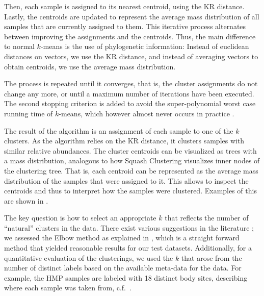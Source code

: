 Then, each sample is assigned to its nearest centroid, using the KR distance. %
Lastly, the centroids are updated to represent
the average mass distribution of all samples that are currently assigned to them.
This iterative process alternates between improving the assignments and the centroids.
Thus, the main difference to normal $k$-means is the use of phylogenetic information:
Instead of euclidean distances on vectors, we use the KR distance,
and instead of averaging vectors to obtain centroids, we use the average mass distribution.

The process is repeated until it converges,
that is, the cluster assignments do not change any more,
or until a maximum number of iterations have been executed.
The second stopping criterion is added to avoid the super-polynomial worst case running time of $k$-means,
which however almost never occurs in practice \cite{Bottou1995,Arthur2006}.

The result of the algorithm is an assignment of each sample to one of the $k$ clusters.
As the algorithm relies on the KR distance, it clusters samples with similar relative abundances.
The cluster centroids can be visualized as trees with a mass distribution,
analogous to how Squash Clustering visualizes inner nodes of the clustering tree.
That is, each centroid can be represented as the average mass distribution of the samples that were assigned to it.
This allows to inspect the centroids and thus to interpret how the samples were clustered.
Examples of this are shown in .

The key question is how to select an appropriate $k$
that reflects the number of ``natural'' clusters in the data.
There exist various suggestions in the literature
\cite{Thorndike1953,Rousseeuw1987,Bischof1999,Pelleg2000,Tibshirani2001,Hamerly2004};
we assessed the Elbow method \cite{Thorndike1953} as explained in ,
which is a straight forward method that yielded reasonable results for our test datasets.
Additionally, for a quantitative evaluation of the clusterings,
we used the $k$ that arose from the number of distinct labels based on the available meta-data for the data.
For example, the \ac{HMP} samples are labeled with \num{18} distinct body sites,
describing where each sample was taken from, c.f.~.

